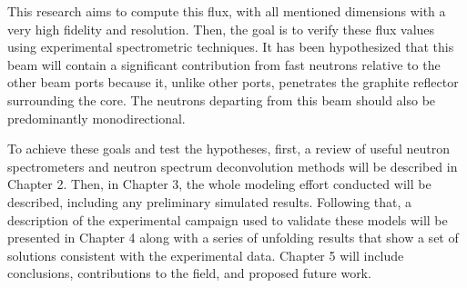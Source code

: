 This research aims to compute this flux, with all mentioned dimensions with a very high fidelity and resolution.
Then, the goal is to verify these flux values using experimental spectrometric techniques.
It has been hypothesized that this beam will contain a significant contribution from fast neutrons relative to the other beam ports because it, unlike other ports, penetrates the graphite reflector surrounding the core.
The neutrons departing from this beam should also be predominantly monodirectional.

To achieve these goals and test the hypotheses, first, a review of useful neutron spectrometers and neutron spectrum deconvolution methods will be described in Chapter 2.
Then, in Chapter 3, the whole modeling effort conducted will be described, including any preliminary simulated results.
Following that, a description of the experimental campaign used to validate these models will be presented in Chapter 4 along with a series of unfolding results that show a set of solutions consistent with the experimental data.
Chapter 5 will include conclusions, contributions to the field, and proposed future work.


